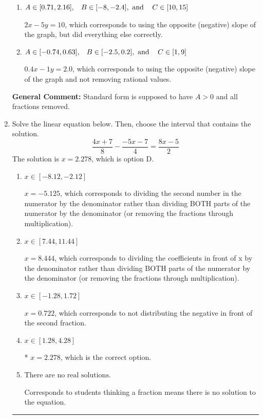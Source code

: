 \documentclass{extbook}[14pt]
\newcommand{\litem}[1]{\item #1

\rule{\textwidth}{0.4pt}}
\begin{document}
\begin{enumerate}
{\begin{enumerate}[label=\Alph*.]
* $2x + 5y = -10$, which is the correct option.
\item \( A \in [0.71, 2.16], \hspace{3mm} B \in [-8, -2.4], \text{ and } \hspace{3mm} C \in [10, 15] \)

 $2x - 5y = 10$, which corresponds to using the opposite (negative) slope of the graph, but did everything else correctly.
\item \( A \in [-0.74, 0.63], \hspace{3mm} B \in [-2.5, 0.2], \text{ and } \hspace{3mm} C \in [1, 9] \)

 $0.4x - 1y = 2.0$, which corresponds to using the opposite (negative) slope of the graph and not removing rational values.
\end{enumerate}

\textbf{General Comment:} Standard form is supposed to have $A > 0$ and all fractions removed.
}
\litem{
Solve the linear equation below. Then, choose the interval that contains the solution.
\[ \frac{4x + 7}{8} - \frac{-5x -7}{4} = \frac{8x -5}{2} \]The solution is \( x = 2.278 \), which is option D.\begin{enumerate}[label=\Alph*.]
\item \( x \in [-8.12, -2.12] \)

 $x = -5.125$, which corresponds to dividing the second number in the numerator by the denominator rather than dividing BOTH parts of the numerator by the denominator (or removing the fractions through multiplication).
\item \( x \in [7.44, 11.44] \)

 $x = 8.444$, which corresponds to dividing the coefficients in front of x by the denominator rather than dividing BOTH parts of the numerator by the denominator (or removing the fractions through multiplication).
\item \( x \in [-1.28, 1.72] \)

 $x = 0.722$, which corresponds to not distributing the negative in front of the second fraction.
\item \( x \in [1.28, 4.28] \)

* $x = 2.278$, which is the correct option.
\item \( \text{There are no real solutions.} \)

Corresponds to students thinking a fraction means there is no solution to the equation.
\end{enumerate}

}
\end{enumerate}
\end{document}
